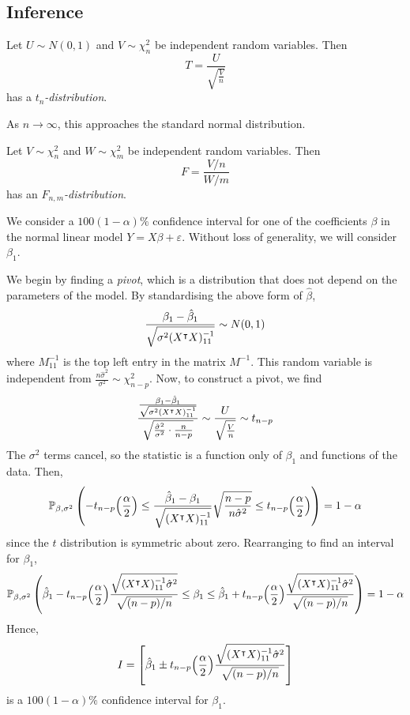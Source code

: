 \subsection{Inference}
\begin{definition}
	Let \( U \sim N(0,1) \) and \( V \sim \chi^2_n \) be independent random variables.
	Then
	\[ T = \frac{U}{\sqrt{\frac{V}{n}}} \]
	has a \textit{\( t_n \)-distribution}.
\end{definition}
As \( n \to \infty \), this approaches the standard normal distribution.
\begin{definition}
	Let \( V \sim \chi^2_n \) and \( W \sim \chi^2_m \) be independent random variables.
	Then
	\[ F = \frac{V/n}{W/m} \]
	has an \textit{\( F_{n,m} \)-distribution}.
\end{definition}
\begin{example}
	We consider a \( 100(1-\alpha)\% \) confidence interval for one of the coefficients \( \beta \) in the normal linear model \( Y = X\beta + \varepsilon \).
	Without loss of generality, we will consider \( \beta_1 \).

	We begin by finding a \textit{pivot}, which is a distribution that does not depend on the parameters of the model.
	By standardising the above form of \( \hat \beta \),
	\[ \frac{\beta_1 - \hat \beta_1}{\sqrt{\sigma^2(X^\intercal X)^{-1}_{11}}} \sim N(0,1) \]
	where \( M^{-1}_{11} \) is the top left entry in the matrix \( M^{-1} \).
	This random variable is independent from \( \frac{n\hat \sigma^2}{\sigma^2} \sim \chi^2_{n-p} \).
	Now, to construct a pivot, we find
	\[ \frac{\frac{\beta_1 - \hat \beta_1}{\sqrt{\sigma^2(X^\intercal X)^{-1}_{11}}}}{\sqrt{\frac{\hat \sigma^2}{\sigma^2} \cdot \frac{n}{n-p}}} \sim \frac{U}{\sqrt{\frac{V}{n}}} \sim t_{n-p} \]
	The \( \sigma^2 \) terms cancel, so the statistic is a function only of \( \beta_1 \) and functions of the data.
	Then,
	\[ \mathbb{P}_{\beta,\sigma^2}\left({ -t_{n-p}\qty(\frac{\alpha}{2}) \leq \frac{\hat \beta_1 - \beta_1}{\sqrt{(X^\intercal X)^{-1}_{11}}} \sqrt{\frac{n-p}{n\hat\sigma^2}} \leq t_{n-p}\qty(\frac{\alpha}{2}) }\right) = 1-\alpha \]
	since the \( t \) distribution is symmetric about zero.
	Rearranging to find an interval for \( \beta_1 \),
	\[ \mathbb{P}_{\beta,\sigma^2}\left({
		\hat \beta_1 - t_{n-p}\qty(\frac{\alpha}{2}) \frac{\sqrt{(X^\intercal X)^{-1}_{11} \hat\sigma^2}}{\sqrt{(n-p)/n}}
		\leq \beta_1 \leq
		\hat \beta_1 + t_{n-p}\qty(\frac{\alpha}{2}) \frac{\sqrt{(X^\intercal X)^{-1}_{11} \hat\sigma^2}}{\sqrt{(n-p)/n}}
		}\right) = 1-\alpha \]
	Hence,
	\[ I = \qty[\hat \beta_1 \pm t_{n-p}\qty(\frac{\alpha}{2}) \frac{\sqrt{(X^\intercal X)^{-1}_{11} \hat \sigma^2}}{\sqrt{(n-p)/n}} ] \]
	is a \( 100(1-\alpha)\% \) confidence interval for \( \beta_1 \).


\end{example}
